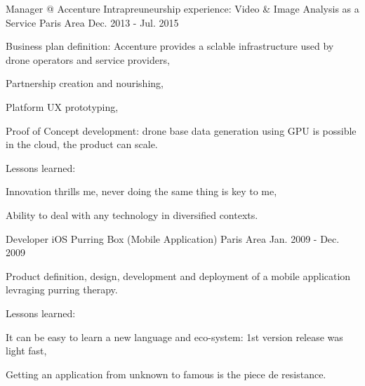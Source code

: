 
\begin{cventries}

  \cventry
    {Manager @ Accenture} %
    {Intrapreuneurship experience: Video \& Image Analysis as a Service} %
    {Paris Area} %
    {Dec. 2013 - Jul. 2015} %
    {
      \begin{cvitems} %
        \item {Business plan definition: Accenture provides a sclable infrastructure used by drone operators and service providers,}
        \item {Partnership creation and nourishing,}
        \item {Platform UX prototyping,}
        \item {Proof of Concept development: drone base data generation using GPU is possible in the cloud, the product can scale.}
        \item {Lessons learned:}
        \begin{cvsubitems}
          \item {Innovation thrills me, never doing the same thing is key to me,}
          \item {Ability to deal with any technology in diversified contexts.}
        \end{cvsubitems}
      \end{cvitems}
    }

  \cventry
    {Developer iOS} %
    {Purring Box (Mobile Application)} %
    {Paris Area} %
    {Jan. 2009 - Dec. 2009} %
    {
      \begin{cvitems} %
        \item {Product definition, design, development and deployment of a mobile application levraging purring therapy.}
        \item {Lessons learned:}
        \begin{cvsubitems}
          \item {It can be easy to learn a new language and eco-system: 1st version release was light fast,}
          \item {Getting an application from unknown to famous is the piece de resistance.}
        \end{cvsubitems}
      \end{cvitems}
    }


\end{cventries}
